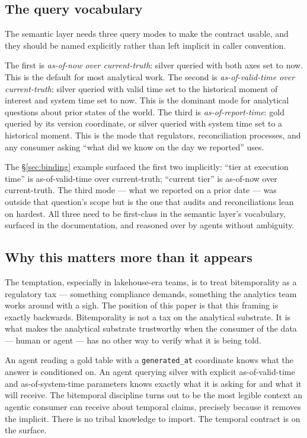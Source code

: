 \documentclass[11pt,a4paper]{article}
\begin{document}
\subsection{The query vocabulary}

The semantic layer needs three query modes to make the contract usable, and they should be named explicitly rather than left implicit in caller convention.

The first is \emph{as-of-now over current-truth}: silver queried with both axes set to now. This is the default for most analytical work. The second is \emph{as-of-valid-time over current-truth}: silver queried with valid time set to the historical moment of interest and system time set to now. This is the dominant mode for analytical questions about prior states of the world. The third is \emph{as-of-report-time}: gold queried by its version coordinate, or silver queried with system time set to a historical moment. This is the mode that regulators, reconciliation processes, and any consumer asking ``what did we know on the day we reported'' uses.

The \S\ref{sec:binding} example surfaced the first two implicitly: ``tier at execution time'' is as-of-valid-time over current-truth; ``current tier'' is as-of-now over current-truth. The third mode --- what we reported on a prior date --- was outside that question's scope but is the one that audits and reconciliations lean on hardest. All three need to be first-class in the semantic layer's vocabulary, surfaced in the documentation, and reasoned over by agents without ambiguity.

\subsection{Why this matters more than it appears}

The temptation, especially in lakehouse-era teams, is to treat bitemporality as a regulatory tax --- something compliance demands, something the analytics team works around with a sigh. The position of this paper is that this framing is exactly backwards. Bitemporality is not a tax on the analytical substrate. It is what makes the analytical substrate trustworthy when the consumer of the data --- human or agent --- has no other way to verify what it is being told.

An agent reading a gold table with a \texttt{generated\_at} coordinate knows what the answer is conditioned on. An agent querying silver with explicit as-of-valid-time and as-of-system-time parameters knows exactly what it is asking for and what it will receive. The bitemporal discipline turns out to be the most legible context an agentic consumer can receive about temporal claims, precisely because it removes the implicit. There is no tribal knowledge to import. The temporal contract is on the surface.
\end{document}
